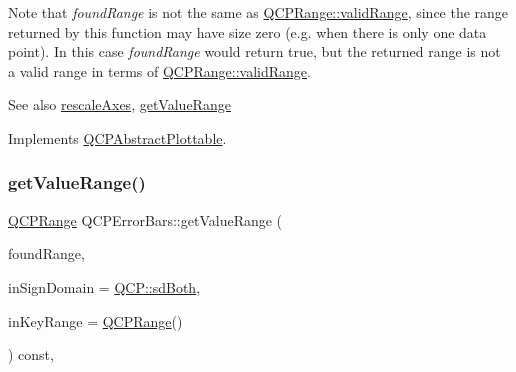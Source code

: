 Note that {\itshape found\+Range} is not the same as \hyperlink{class_q_c_p_range_ab38bd4841c77c7bb86c9eea0f142dcc0}{Q\+C\+P\+Range\+::valid\+Range}, since the range returned by this function may have size zero (e.\+g. when there is only one data point). In this case {\itshape found\+Range} would return true, but the returned range is not a valid range in terms of \hyperlink{class_q_c_p_range_ab38bd4841c77c7bb86c9eea0f142dcc0}{Q\+C\+P\+Range\+::valid\+Range}.

\begin{DoxySeeAlso}{See also}
\hyperlink{class_q_c_p_abstract_plottable_a1491c4a606bccd2d09e65e11b79eb882}{rescale\+Axes}, \hyperlink{class_q_c_p_error_bars_ab76215a186ae4862235821e028685f26}{get\+Value\+Range} 
\end{DoxySeeAlso}


Implements \hyperlink{class_q_c_p_abstract_plottable_a4da16d3cd4b509e1104a9b0275623c96}{Q\+C\+P\+Abstract\+Plottable}.

\mbox{\label{class_q_c_p_error_bars_ab76215a186ae4862235821e028685f26}} 
\subsubsection{\texorpdfstring{get\+Value\+Range()}{getValueRange()}\hspace{0.1cm}{\footnotesize\ttfamily [1/2]}}
{\footnotesize\ttfamily \hyperlink{class_q_c_p_range}{Q\+C\+P\+Range} Q\+C\+P\+Error\+Bars\+::get\+Value\+Range (\begin{DoxyParamCaption}\item[{bool \&}]{found\+Range,  }\item[{\hyperlink{namespace_q_c_p_afd50e7cf431af385614987d8553ff8a9}{Q\+C\+P\+::\+Sign\+Domain}}]{in\+Sign\+Domain = {\ttfamily \hyperlink{namespace_q_c_p_afd50e7cf431af385614987d8553ff8a9a3dee7e9cd2fedce9253b83e172626a6c}{Q\+C\+P\+::sd\+Both}},  }\item[{const \hyperlink{class_q_c_p_range}{Q\+C\+P\+Range} \&}]{in\+Key\+Range = {\ttfamily \hyperlink{class_q_c_p_range}{Q\+C\+P\+Range}()} }\end{DoxyParamCaption}) const\hspace{0.3cm}{\ttfamily [protected]}, {\ttfamily [virtual]}}

